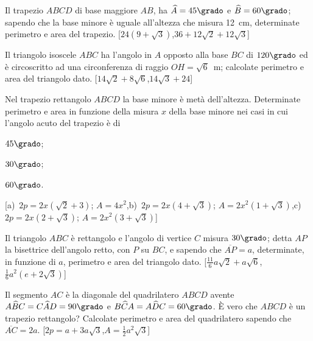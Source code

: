 \begin{multicols}{2}
\begin{esercizio}
\label{ese:7.28}
Il trapezio $ABCD$ di base maggiore $AB$, ha $\widehat{A}=45\grado$ e 
$\widehat{B}=60\grado$; sapendo che la base minore è uguale 
all'altezza che misura 12~cm, determinate perimetro e area del 
trapezio.
\hfill[$24(9+\sqrt{3})$,\quad $36+12\sqrt{2}+12\sqrt{3}$]
\end{esercizio}

\begin{esercizio}
\label{ese:7.30}
Il triangolo isoscele $ABC$ ha l'angolo in $A$ opposto alla base $BC$ 
di $120\grado$ ed è circoscritto ad una circonferenza di raggio 
$OH=\sqrt{6}$~m; calcolate perimetro e area del triangolo dato.
\hfill[$14\sqrt{2}+8\sqrt{6}$,\quad $14\sqrt{3}+24$]
\end{esercizio}

\begin{esercizio}
\label{ese:7.32}
Nel trapezio rettangolo $ABCD$ la base minore è metà dell'altezza. 
Determinate perimetro e area in funzione della misura $x$ della base 
minore nei casi in cui l'angolo acuto del trapezio è di
\begin{enumeratea}
\item $45\grado$;
\item $30\grado$;
\item $60\grado$.
\end{enumeratea}
\hfill[a)~$2p=2x(\sqrt{2}+3)$; $A=4x^2$,\quad b)~$2p=2x(4+\sqrt{3})$; 
$A=2x^2(1+\sqrt{3})$,\quad c)~$2p=2x(2+\sqrt{3})$; 
$A=2x^2(3+\sqrt{3})$]
\end{esercizio}

\begin{esercizio}
\label{ese:7.33}
Il triangolo $ABC$ è rettangolo e l'angolo di vertice $C$ misura 
$30\grado$; detta $AP$ la bisettrice dell'angolo retto, con $P$ su 
$BC$, e sapendo che $\overline{AP}=a$, determinate, in funzione di 
$a$, perimetro e area del triangolo dato.
\hfill[$\frac{11}{6}a\sqrt{2}+a\sqrt{6}$,\quad $\frac{1}{6}a^2(e+2\sqrt{3})$]
\end{esercizio}

\begin{esercizio}
\label{ese:7.34}
Il segmento $AC$ è la diagonale del quadrilatero $ABCD$ avente 
$A\widehat{B}C=C\widehat{A}D=90\grado$ e 
$B\widehat{C}A=A\widehat{D}C=60\grado$. \`E vero che $ABCD$ è un 
trapezio rettangolo? Calcolate perimetro e area del quadrilatero 
sapendo che $\overline{AC}=2a$.
\hfill[$2p=a+3a\sqrt{3}$,\quad $A=\frac{1}{2}a^2\sqrt{3}$]
\end{esercizio}


\end{multicols}
